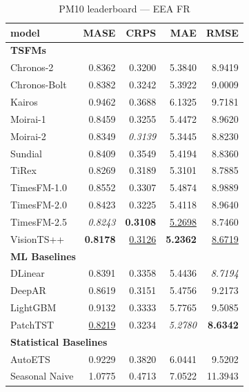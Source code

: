 \begin{table}[H]
\caption{PM10 leaderboard --- EEA FR}
\centering
\begin{small}
\begin{tabular}{lrrrr}
\toprule
model & MASE & CRPS & MAE & RMSE \\
\midrule
\multicolumn{5}{l}{\textbf{TSFMs}} \\
Chronos-2 & 0.8362 & 0.3200 & 5.3840 & 8.9419 \\
Chronos-Bolt & 0.8382 & 0.3242 & 5.3922 & 9.0009 \\
Kairos & 0.9462 & 0.3688 & 6.1325 & 9.7181 \\
Moirai-1 & 0.8459 & 0.3255 & 5.4472 & 8.9620 \\
Moirai-2 & 0.8349 & \textit{0.3139} & 5.3445 & 8.8230 \\
Sundial & 0.8409 & 0.3549 & 5.4194 & 8.8360 \\
TiRex & 0.8269 & 0.3189 & 5.3101 & 8.7885 \\
TimesFM-1.0 & 0.8552 & 0.3307 & 5.4874 & 8.9889 \\
TimesFM-2.0 & 0.8423 & 0.3225 & 5.4118 & 8.9640 \\
TimesFM-2.5 & \textit{0.8243} & \textbf{0.3108} & \underline{5.2698} & 8.7460 \\
VisionTS++ & \textbf{0.8178} & \underline{0.3126} & \textbf{5.2362} & \underline{8.6719} \\
\midrule
\multicolumn{5}{l}{\textbf{ML Baselines}} \\
DLinear & 0.8391 & 0.3358 & 5.4436 & \textit{8.7194} \\
DeepAR & 0.8619 & 0.3151 & 5.4756 & 9.2173 \\
LightGBM & 0.9132 & 0.3333 & 5.7765 & 9.5085 \\
PatchTST & \underline{0.8219} & 0.3234 & \textit{5.2780} & \textbf{8.6342} \\
\midrule
\multicolumn{5}{l}{\textbf{Statistical Baselines}} \\
AutoETS & 0.9229 & 0.3820 & 6.0441 & 9.5202 \\
Seasonal Naive & 1.0775 & 0.4713 & 7.0522 & 11.3943 \\
\bottomrule
\end{tabular}
\end{small}
\end{table}